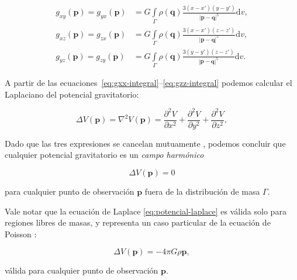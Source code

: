 \begin{align}
    g_{xy}(\mathbf{p}) =
    g_{yx}(\mathbf{p}) &=
        G \int\limits_\Gamma \rho(\mathbf{q})
        \frac{3(x - x')(y - y')}{|\mathbf{p} - \mathbf{q}|^5}
        \text{d}v,
    \label{eq:gxy-integral}
    \\
    g_{xz}(\mathbf{p}) =
    g_{zx}(\mathbf{p}) &=
        G \int\limits_\Gamma \rho(\mathbf{q})
        \frac{3(x - x')(z - z')}{|\mathbf{p} - \mathbf{q}|^5}
        \text{d}v,
    \label{eq:gxz-integral}
    \\
    g_{yz}(\mathbf{p}) =
    g_{zy}(\mathbf{p}) &=
        G \int\limits_\Gamma \rho(\mathbf{q})
        \frac{3(y - y')(z - z')}{|\mathbf{p} - \mathbf{q}|^5}
        \text{d}v.
    \label{eq:gyz-integral}
\end{align}

A partir de las ecuaciones~\ref{eq:gxx-integral}--\ref{eq:gzz-integral} podemos
calcular el Laplaciano del potencial gravitatorio:

\begin{equation}
    \Delta V(\mathbf{p}) = \nabla^2 V(\mathbf{p}) =
        \frac{\partial^2 V}{\partial x^2}
        + \frac{\partial^2 V}{\partial y^2}
        + \frac{\partial^2 V}{\partial z^2},
\end{equation}

\noindent Dado que las tres expresiones se cancelan mutuamente
\citep{blakely1995}, podemos concluir que cualquier potencial gravitatorio es
un \emph{campo harmónico}

\begin{equation}
    \Delta V(\mathbf{p}) = 0
    \label{eq:potencial-laplace}
\end{equation}

\noindent para cualquier punto de observación $\mathbf{p}$ fuera de la
distribución de masa $\Gamma$.

Vale notar que la ecuación de Laplace \ref{eq:potencial-laplace} es válida
solo para regiones libres de masas, y representa un caso particular de la
ecuación de Poisson \citep{blakely1995}:

\begin{equation}
    \Delta V(\mathbf{p}) = -4\pi G \rho{\mathbf{p}},
    \label{eq:potencial-poisson}
\end{equation}

\noindent válida para cualquier punto de observación $\mathbf{p}$.


